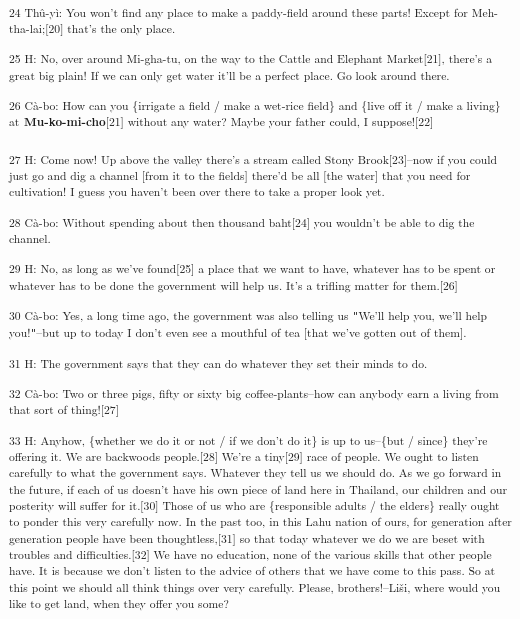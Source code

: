 {\textsuperscript{24 Thû-yì: You won't find any place to make a paddy-field
around these parts! Except for Meh-tha-lai;[20] that's the only place.}}

{\textsuperscript{25 H: No, over around Mi-gha-tu, on the way to the Cattle
and Elephant Market[21], there's a great big plain! If we can only get water it'll
be a perfect place. Go look around there. }}

{\textsuperscript{26 Cà-bo: How can you \{irrigate a field / make a wet-rice
field\} and \{live off it / make a living\} at }}{\textsuperscript{\textbf{Mu-ko-mi-cho}}}{\textsuperscript{[21]
without any water? Maybe your father could, I suppose![22]}}

{\textsuperscript{27 H: Come now! Up above the valley there's a stream called
Stony Brook[23]--now if you could just go and dig a channel [from it to the fields]
there'd be all [the water] that you need for cultivation! I guess you haven't been
over there to take a proper look yet. }}

{\textsuperscript{28 Cà-bo: Without spending about then thousand baht[24]
you wouldn't be able to dig the channel. }}

{\textsuperscript{29 H: No, as long as we've found[25] a place that we want
to have, whatever has to be spent or whatever has to be done the government will
help us. It's a trifling matter for them.[26]}}

{\textsuperscript{30 Cà-bo: Yes, a long time ago, the government was also
telling us \texttt{"}We'll help you, we'll help you!\texttt{"}--but up to today
I don't even see a mouthful of tea [that we've gotten out of them]. }}

{\textsuperscript{31 H: The government says that they can do whatever they
set their minds to do. }}

{\textsuperscript{32 Cà-bo: Two or three pigs, fifty or sixty big coffee-plants--how
can anybody earn a living from that sort of thing![27]}}

{\textsuperscript{33 H: Anyhow, \{whether we do it or not / if we don't
do it\} is up to us--\{but / since\} they're offering it. We are backwoods people.[28]
We're a tiny[29] race of people. We ought to listen carefully to what the government
says. Whatever they tell us we should do. As we go forward in the future, if each
of us doesn't have his own piece of land here in Thailand, our children and our
posterity will suffer for it.[30] Those of us who are \{responsible adults / the
elders\} really ought to ponder this very carefully now. In the past too, in this
Lahu nation of ours, for generation after generation people have been thoughtless,[31]
so that today whatever we do we are beset with troubles and difficulties.[32] We
have no education, none of the various skills that other people have. It is because
we don't listen to the advice of others that we have come to this pass. So at this
point we should all think things over very carefully. Please, brothers!--Liši,
where would you like to get land, when they offer you some?}}

